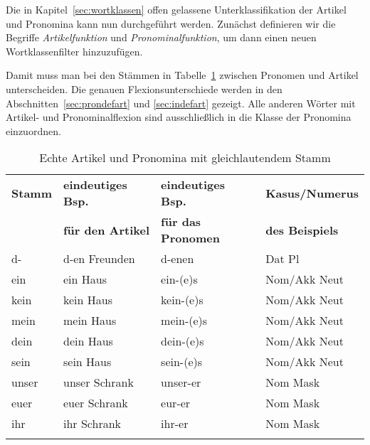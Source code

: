 Die in Kapitel~\ref{sec:wortklassen} offen gelassene Unterklassifikation der Artikel und Pronomina kann nun durchgeführt werden.
Zunächst definieren wir die Begriffe \textit{Artikelfunktion} und \textit{Pronominalfunktion}, um dann einen neuen Wortklassenfilter hinzuzufügen.

\Np




\Enl

Damit muss man bei den Stämmen in Tabelle~\ref{tab:art} zwischen Pronomen und Artikel unterscheiden.
Die genauen Flexionsunterschiede werden in den Abschnitten~\ref{sec:prondefart} und \ref{sec:indefart} gezeigt.
Alle anderen Wörter mit Artikel- und Pronominalflexion sind ausschließlich in die Klasse der Pronomina einzuordnen.

\begin{table}[!htbp]
  \centering
  \begin{tabular}{llll}
    \lsptoprule
    \textbf{Stamm} & \textbf{eindeutiges Bsp.} & \textbf{eindeutiges Bsp.} & \textbf{Kasus\slash Numerus} \\
    & \textbf{für den Artikel} & \textbf{für das Pronomen} & \textbf{des Beispiels} \\
    \midrule
    d- & d-en Freunden & d-enen & Dat Pl \\
    ein & ein Haus & ein-(e)s & Nom/Akk Neut \\
    kein & kein Haus & kein-(e)s & Nom/Akk Neut \\
    mein & mein Haus & mein-(e)s & Nom/Akk Neut \\
    dein & dein Haus & dein-(e)s & Nom/Akk Neut \\
    sein & sein Haus & sein-(e)s & Nom/Akk Neut \\
    unser & unser Schrank & unser-er & Nom Mask \\
    euer & euer Schrank & eur-er & Nom Mask \\
    ihr & ihr Schrank & ihr-er & Nom Mask \\
    \lspbottomrule
  \end{tabular}
  \caption{Echte Artikel und Pronomina mit gleichlautendem Stamm}
  \label{tab:art}
\end{table}

